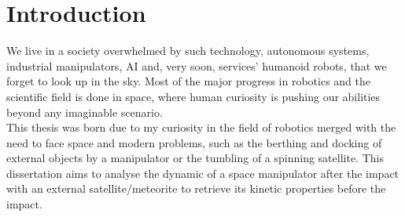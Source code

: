 \documentclass[a4paper,12pt,oneside]{report}
\begin{document}
\newpage

\begin{abstract}


\end{abstract}

\newpage


\tableofcontents

\chapter*{Introduction}
We live in a society overwhelmed by such technology, autonomous systems, industrial manipulators, AI and, very soon, services' humanoid robots, that we forget to look up in the sky. Most of the major progress in robotics and the scientific field is done in space, where human curiosity is pushing our abilities beyond any imaginable scenario.\\
This thesis was born due to my curiosity in the field of robotics merged with the need to face space and modern problems, such as the berthing and docking of external objects by a manipulator or the tumbling of a spinning satellite. This dissertation aims to analyse the dynamic of a space manipulator after the impact with an external satellite/meteorite to retrieve its kinetic properties before the impact.\\
\clearpage
{}
\end{document}
